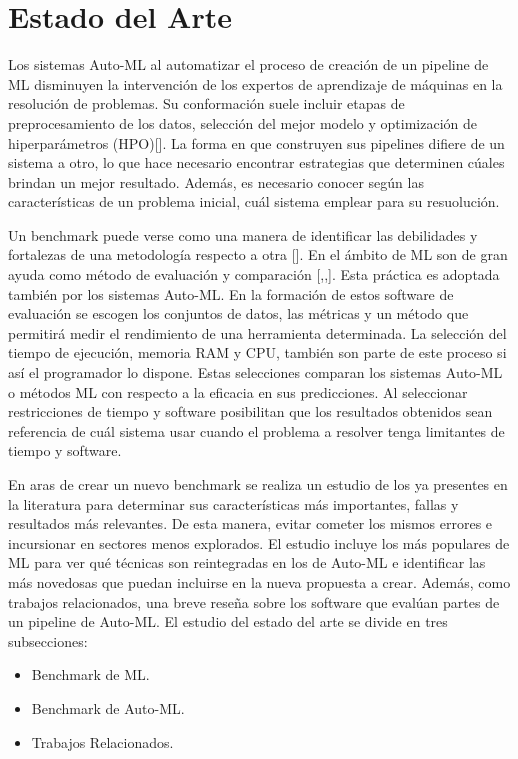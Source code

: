 \chapter{Estado del Arte}\label{chapter:state-of-the-art}

Los sistemas Auto-ML al automatizar el proceso de creación de un pipeline de ML disminuyen la intervención de los expertos de aprendizaje de máquinas en la resolución de 
problemas. Su conformación suele incluir etapas de preprocesamiento de los datos, selección del mejor modelo y optimización de hiperparámetros (HPO)[\cite{36}].
La forma en que construyen sus pipelines difiere de un sistema a otro, lo que hace necesario encontrar estrategias que determinen cúales brindan un 
mejor resultado. Además, es necesario conocer según las características de un problema inicial, cuál sistema emplear para su resuolución. 

Un benchmark puede verse como una manera de identificar las debilidades y fortalezas de una metodología respecto a otra [\cite{2}]. En el ámbito de ML son de 
gran ayuda como método de evaluación y comparación [\cite{5},\cite{6},\cite{46}]. Esta práctica es adoptada también por los sistemas Auto-ML. En la formación de estos 
software de evaluación se escogen los conjuntos de datos, las métricas y un método que permitirá medir el rendimiento de una herramienta determinada. La selección del 
tiempo de ejecución, memoria RAM y CPU, también son parte de este proceso si así el programador lo dispone. Estas selecciones comparan los sistemas Auto-ML o métodos ML 
con respecto a la eficacia en sus predicciones. Al seleccionar restricciones de tiempo y software posibilitan que los resultados obtenidos sean referencia de cuál 
sistema usar cuando el problema a resolver tenga limitantes de tiempo y software.

En aras de crear un nuevo benchmark se realiza un estudio de los ya presentes en la literatura para determinar sus características más importantes, 
fallas y resultados más relevantes. De esta manera, evitar cometer los mismos errores e incursionar en sectores menos explorados. El estudio incluye los más 
populares de ML para ver qué técnicas son reintegradas en los de Auto-ML e identificar las más novedosas que puedan incluirse en la nueva propuesta a crear. Además, 
como trabajos relacionados, una breve reseña sobre los software que evalúan partes de un pipeline de Auto-ML. El estudio del estado del arte se divide en tres 
subsecciones:
\begin{itemize}
\item Benchmark de ML. 
\item Benchmark de Auto-ML.
\item Trabajos Relacionados.
\end{itemize}
